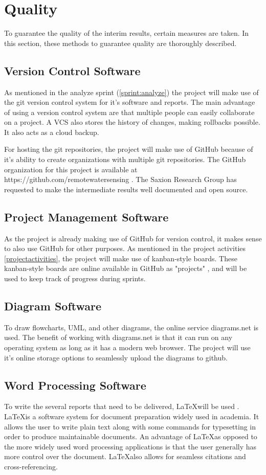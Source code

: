 \documentclass[11pt, a4paper]{article}
\begin{document}
\section{Quality}
To guarantee the quality of the interim results, certain measures are taken. In this section, these methods to guarantee quality are thoroughly described.

\subsection{Version Control Software}
As mentioned in the analyze sprint (\ref{sprint:analyze}) the project will make use of the git version control system for it's software and reports. The main advantage of using a version control system are that multiple people can easily collaborate on a project. A VCS also stores the history of changes, making rollbacks possible. It also acts as a cloud backup.

For hosting the git repositories, the project will make use of GitHub \cite{gh} because of it's ability to create organizations with multiple git repositories. The GitHub organization for this project is available at https://github.com/remotewatersensing . The Saxion Research Group has requested to make the intermediate results well documented and open source.

\subsection{Project Management Software}
As the project is already making use of GitHub for version control, it makes sense to also use GitHub for other purposes. As mentioned in the project activities \ref{projectactivities}, the project will make use of kanban-style boards. These kanban-style boards are online available in GitHub as "projects" \cite{ghprojects}, and will be used to keep track of progress during sprints.

\subsection{Diagram Software}
To draw flowcharts, UML, and other diagrams, the online service diagrams.net \cite{diagrams} is used. The benefit of working with diagrams.net is that it can run on any operating system as long as it has a modern web browser. The project will use it's online storage options to seamlessly upload the diagrams to github.

\subsection{Word Processing Software}
To write the several reports that need to be delivered, \LaTeX will be used \cite{latex}. \LaTeX is a software system for document preparation widely used in academia. It allows the user to write plain text along with some commands for typesetting in order to produce maintainable documents. An advantage of \LaTeX as opposed to the more widely used word processing applications is that the user generally has more control over the document. \LaTeX also allows for seamless citations and cross-referencing.
\end{document}
